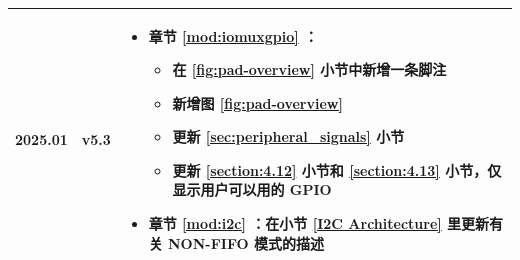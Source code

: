 \begin{longtable}[l]{ | m{2cm} | m{1.5cm} | m{12cm} | }
2025.01 & v5.3 &
\vspace{0.5em}
 \begin{itemize}
        \item 章节 \ref{mod:iomuxgpio} \textit{\nameref{mod:iomuxgpio}}：
        \begin{itemize}
            \item 在 \ref{fig:pad-overview} \textit{\nameref{fig:pad-overview}} 小节中新增一条脚注 %
            \item 新增图 \ref{fig:pad-overview} \textit{\nameref{fig:pad-overview}} %
            \item 更新 \ref{sec:peripheral_signals} \textit{\nameref{sec:peripheral_signals}} 小节 %
            \item 更新 \ref{section:4.12} \textit{\nameref{section:4.12}} 小节和 \ref{section:4.13} \textit{\nameref{section:4.13}} 小节，仅显示用户可以用的 GPIO %
        \end{itemize}
    \item 章节 \ref{mod:i2c} \textit{\nameref{mod:i2c}}：在小节 \ref{I2C Architecture} 里更新有关 NON-FIFO 模式的描述
  \end{itemize}
  \vspace{-1em}
  \\\hline


\end{longtable}
